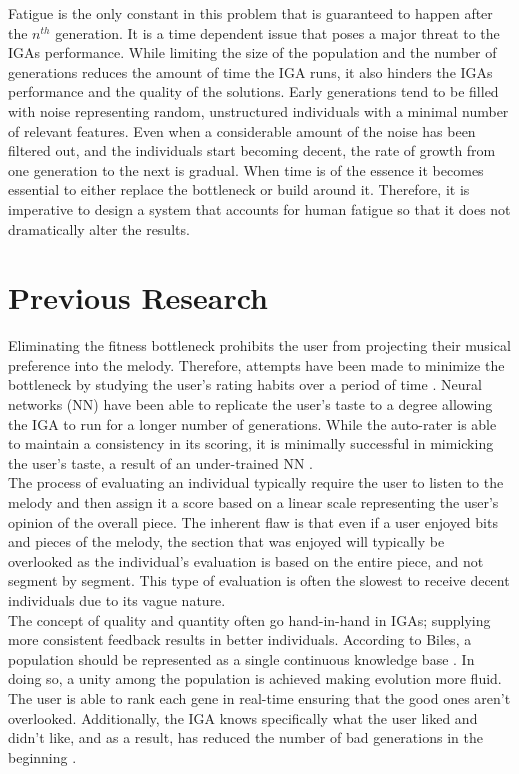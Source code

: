 \documentclass[12pt]{article} %
\begin{document}
Fatigue is the only constant in this problem that is guaranteed to happen after the $n^{th}$ generation. It is a time dependent issue that poses a major threat to the IGAs performance. While limiting the size of the population and the number of generations reduces the amount of time the IGA runs, it also hinders the IGAs performance and the quality of the solutions. Early generations tend to be filled with noise representing random, unstructured individuals with a minimal number of relevant features. Even when a considerable amount of the noise has been filtered out, and the individuals start becoming decent, the rate of growth from one generation to the next is gradual. When time is of the essence it becomes essential to either replace the bottleneck or build around it. Therefore, it is imperative to design a system that accounts for human fatigue so that it does not dramatically alter the results. 

\section{Previous Research}
Eliminating the fitness bottleneck prohibits the user from projecting their musical preference into the melody. Therefore, attempts have been made to minimize the bottleneck by studying the user's rating habits over a period of time \cite{Nao}. Neural networks (NN) have been able to replicate the user's taste to a degree allowing the IGA to run for a longer number of generations. While the auto-rater is able to maintain a consistency in its scoring, it is minimally successful in mimicking the user's taste, a result of an under-trained NN \cite{RBecker}. \\

The process of evaluating an individual typically require the user to listen to the melody and then assign it a score based on a linear scale representing the user's opinion of the overall piece. The inherent flaw is that even if a user enjoyed bits and pieces of the melody, the section that was enjoyed will typically be overlooked as the individual's evaluation is based on the entire piece, and not segment by segment. This type of evaluation is often the slowest to receive decent individuals due to its vague nature. \\

The concept of quality and quantity often go hand-in-hand in IGAs; supplying more consistent feedback results in better individuals. According to Biles, a population should be represented as a single continuous knowledge base \cite{Biles96}. In doing so, a unity among the population is achieved making evolution more fluid. The user is able to rank each gene in real-time ensuring that the good ones aren't overlooked. Additionally, the IGA knows specifically what the user liked and didn't like, and as a result, has reduced the number of bad generations in the beginning \cite{Biles96}. \\
\end{document}
